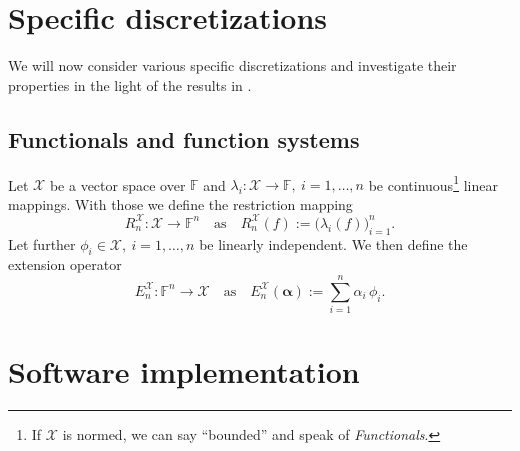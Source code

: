 \documentclass[a4paper]{paper}
\newcommand{\Spc}[1]{\mathscr{#1}}
\newcommand{\Field}{\mathbb{F}}
\newcommand*{\EXT}[2]{\ensuremath{E_{#1}^{#2}}}
\newcommand*{\REST}[2]{\ensuremath{R_{#1}^{#2}}}
\newcommand*{\RnX}{\ensuremath{\REST{n}{\Spc{X}}}}
\newcommand*{\EnX}{\ensuremath{\EXT{n}{\Spc{X}}}}
\newcommand{\valpha}{\boldsymbol{\alpha}}
\begin{document}
\section{Specific discretizations}
\label{sec:specif}

We will now consider various specific discretizations and investigate their properties in the light of the 
results in .



\subsection{Functionals and function systems}
\label{subsec:specif:func_base}

Let $\Spc{X}$ be a vector space over $\Field$ and $\lambda_i \colon \Spc{X} \to \Field,\ i=1,\ldots,n$ be 
continuous\footnote{If $\Spc{X}$ is normed, we can say ``bounded'' and speak of \emph{Functionals}.} linear mappings.
With those we define the restriction mapping
%
\begin{equation*}
 \RnX \colon \Spc{X} \to \Field^n \quad \text{as} \quad \RnX(f) := \big( \lambda_i(f) \big)_{i=1}^n.
\end{equation*}
%
Let further $\phi_i \in \Spc{X},\ i=1,\ldots,n$ be linearly independent. We then define the extension operator
%
\begin{equation*}
 \EnX \colon \Field^n \to \Spc{X} \quad \text{as} \quad \EnX(\valpha) := \sum_{i=1}^n \alpha_i\, \phi_i.
\end{equation*}





\section{Software implementation}
\label{sec:soft}
\end{document}
